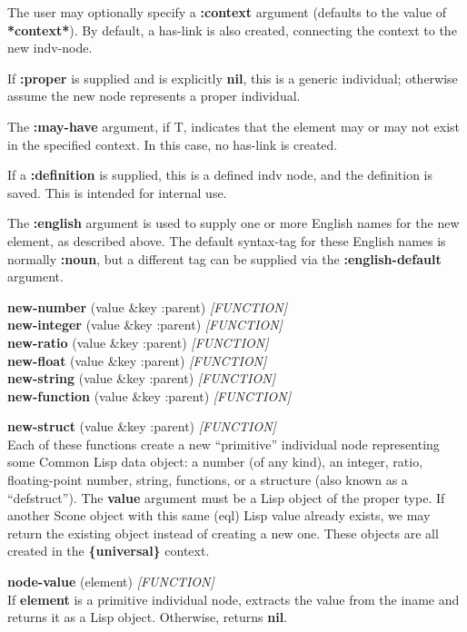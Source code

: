 \documentclass[titlepage,twoside,openright,11pt]{article}
\begin{document}
The user may optionally specify a \textbf{:context} argument (defaults
to the value of \textbf{*context*}). By default, a has-link is also
created, connecting the context to the new indv-node.

If \textbf{:proper} is supplied and is explicitly \textbf{nil}, this is
a generic individual; otherwise assume the new node represents a proper
individual.

The \textbf{:may-have} argument, if T, indicates that the element may or
may not exist in the specified context. In this case, no has-link is
created.

If a \textbf{:definition} is supplied, this is a defined indv node, and
the definition is saved. This is intended for internal use.

The \textbf{:english} argument is used to supply one or more English
names for the new element, as described above. The default syntax-tag
for these English names is normally \textbf{:noun}, but a different tag
can be supplied via the \textbf{:english-default} argument.

\textbf{new-number} (value \&key :parent) \emph{{[}FUNCTION{]}}\\
\textbf{new-integer} (value \&key :parent) \emph{{[}FUNCTION{]}}\\
\textbf{new-ratio} (value \&key :parent) \emph{{[}FUNCTION{]}}\\
\textbf{new-float} (value \&key :parent) \emph{{[}FUNCTION{]}}\\
\textbf{new-string} (value \&key :parent) \emph{{[}FUNCTION{]}}\\
\textbf{new-function} (value \&key :parent) \emph{{[}FUNCTION{]}}

\textbf{new-struct} (value \&key :parent) \emph{{[}FUNCTION{]}}\\
Each of these functions create a new ``primitive'' individual node
representing some Common Lisp data object: a number (of any kind), an
integer, ratio, floating-point number, string, functions, or a structure
(also known as a ``defstruct''). The \textbf{value} argument must be a
Lisp object of the proper type. If another Scone object with this same
(eql) Lisp value already exists, we may return the existing object
instead of creating a new one. These objects are all created in the
\textbf{\{universal\}} context.

\textbf{node-value} (element) \emph{{[}FUNCTION{]}\\
}If \textbf{element} is a primitive individual node, extracts the value
from the iname and returns it as a Lisp object. Otherwise, returns
\textbf{nil}.
\end{document}
